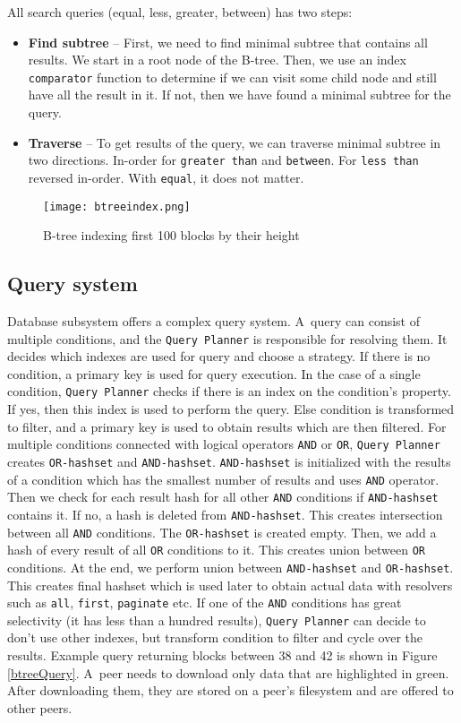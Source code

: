 All search queries (equal, less, greater, between) has two steps:
\begin{itemize}
    \item \textbf{Find subtree} -- First, we need to find minimal subtree that contains all results. We start in a root node of the B-tree. Then, we use an index \texttt{comparator} function to determine if we can visit some child node and still have all the result in it. If not, then we have found a minimal subtree for the query.
    \item \textbf{Traverse} -- To get results of the query, we can traverse minimal subtree in two directions. In-order for \texttt{greater than} and \texttt{between}. For \texttt{less than} reversed in-order. With \texttt{equal}, it does not matter.
\end{itemize}

\begin{figure}[h]
    \centering
    \texttt{[image: btreeindex.png]}
    \caption{B-tree indexing first 100 blocks by their height}
    \label{btree}
\end{figure}

\subsection{Query system}
Database subsystem offers a complex query system. A~query can consist of multiple conditions, and the \texttt{Query Planner} is responsible for resolving them. It decides which indexes are used for query and choose a strategy. If there is no condition, a primary key is used for query execution. In the case of a single condition, \texttt{Query Planner} checks if there is an index on the condition's property. If yes, then this index is used to perform the query. Else condition is transformed to filter, and a primary key is used to obtain results which are then filtered. For multiple conditions connected with logical operators \texttt{AND} or \texttt{OR}, \texttt{Query Planner} creates \texttt{OR-hashset} and \texttt{AND-hashset}. \texttt{AND-hashset} is initialized with the results of a condition which has the smallest number of results and uses \texttt{AND} operator. Then we check for each result hash for all other \texttt{AND} conditions if \texttt{AND-hashset} contains it. If no, a hash is deleted from \texttt{AND-hashset}. This creates intersection between all \texttt{AND} conditions. The \texttt{OR-hashset} is created empty. Then, we add a hash of every result of all \texttt{OR} conditions to it. This creates union between \texttt{OR} conditions. At the end, we perform union between \texttt{AND-hashset} and \texttt{OR-hashset}. This creates final hashset which is used later to obtain actual data with resolvers such as \texttt{all}, \texttt{first}, \texttt{paginate} etc. If one of the \texttt{AND} conditions has great selectivity (it has less than a hundred results), \texttt{Query Planner} can decide to don't use other indexes, but transform condition to filter and cycle over the results. Example query returning blocks between 38 and 42 is shown in Figure \ref{btreeQuery}. A~peer needs to download only data that are highlighted in green. After downloading them, they are stored on a peer's filesystem and are offered to other peers. 

